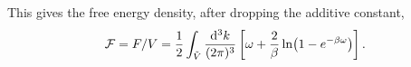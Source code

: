This gives the free energy density, after dropping the additive constant,
\begin{equation}
    \mathcal{F} = F/V 
    = \frac{1}{2} \int_{\tilde V} \frac{\dd^3 k}{(2 \pi)^3}
    \left[
        \omega + \frac{2}{\beta}\ln(1 - e^{-\beta\omega})
    \right].
\end{equation}
